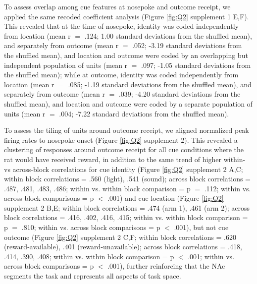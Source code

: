 \documentclass[11pt]{article}
\begin{document}
To assess  overlap among cue features at nosepoke and outcome receipt, we applied the same recoded coefficient analysis (Figure \ref{fig:Q2} supplement 1 E,F). This revealed that at the time of nosepoke, identity was coded independently from location (mean r  $=$ .124; 1.00 standard deviations from the shuffled mean), and separately from outcome (mean r  $=$ .052; -3.19 standard deviations from the shuffled mean), and location and outcome were coded by an overlapping but independent population of units (mean r  $=$ .097;  -1.05 standard deviations from the shuffled mean); while at outcome, identity was coded independently from location (mean r  $=$ .085; -1.19 standard deviations from the shuffled mean), and separately from outcome (mean r  $=$ .039;  -4.20 standard deviations from the shuffled mean), and location and outcome were coded by a separate population of units (mean r  $=$ .004;  -7.22 standard deviations from the shuffled mean). 

To assess the tiling of units around outcome receipt, we aligned normalized peak firing rates to nosepoke onset (Figure \ref{fig:Q2} supplement 2). This revealed a clustering of responses around outcome receipt for all cue conditions where the rat would have received reward, in addition to the same trend of higher within- vs across-block correlations for cue identity (Figure \ref{fig:Q2} supplement 2 A,C; within block correlations = .560 (light), .541 (sound); across block correlations = .487, .481, .483, .486; within vs. within block comparison = p $=$ .112; within vs. across block comparisons = p $<$ .001) and cue location (Figure \ref{fig:Q2} supplement 2 B,E; within block correlations = .474 (arm 1), .461 (arm 2); across block correlations = .416, .402, .416, .415; within vs. within block comparison = p $=$ .810; within vs. across block comparisons = p $<$ .001), but not cue outcome (Figure \ref{fig:Q2} supplement 2 C,F; within block correlations = .620 (reward-available), .401 (reward-unavailable); across block correlations = .418, .414, .390, .408; within vs. within block comparison = p $<$ .001; within vs. across block comparisons = p $<$ .001), further reinforcing that the NAc segments the task and represents all aspects of task space.
\end{document}
